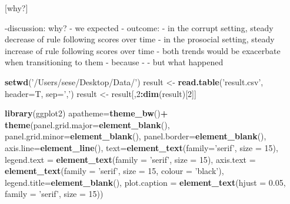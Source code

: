 \documentclass[man]{apa6}
\newenvironment{Shaded}{\begin{snugshade}}{\end{snugshade}}
\newcommand{\DataTypeTok}[1]{\textcolor[rgb]{0.13,0.29,0.53}{#1}}
\newcommand{\DecValTok}[1]{\textcolor[rgb]{0.00,0.00,0.81}{#1}}
\newcommand{\FloatTok}[1]{\textcolor[rgb]{0.00,0.00,0.81}{#1}}
\newcommand{\KeywordTok}[1]{\textcolor[rgb]{0.13,0.29,0.53}{\textbf{#1}}}
\newcommand{\NormalTok}[1]{#1}
\newcommand{\OperatorTok}[1]{\textcolor[rgb]{0.81,0.36,0.00}{\textbf{#1}}}
\newcommand{\StringTok}[1]{\textcolor[rgb]{0.31,0.60,0.02}{#1}}
\begin{document}
{[}why?{]}

-discussion: why? - we expected - outcome: - in the corrupt setting,
steady decrease of rule following scores over time - in the prosocial
setting, steady increase of rule following scores over time - both
trends would be exacerbate when transitioning to them - because - - but
what happened

\begin{Shaded}
\begin{Highlighting}[]
\KeywordTok{setwd}\NormalTok{(}\StringTok{'/Users/sese/Desktop/Data/'}\NormalTok{)}
\NormalTok{result <-}\StringTok{ }\KeywordTok{read.table}\NormalTok{(}\StringTok{'result.csv'}\NormalTok{, }\DataTypeTok{header=}\NormalTok{T, }\DataTypeTok{sep=}\StringTok{','}\NormalTok{)}
\NormalTok{result <-}\StringTok{ }\NormalTok{result[,}\DecValTok{2}\OperatorTok{:}\KeywordTok{dim}\NormalTok{(result)[}\DecValTok{2}\NormalTok{]]}


\KeywordTok{library}\NormalTok{(ggplot2)}
\NormalTok{apatheme=}\KeywordTok{theme_bw}\NormalTok{()}\OperatorTok{+}
\StringTok{  }\KeywordTok{theme}\NormalTok{(}\DataTypeTok{panel.grid.major=}\KeywordTok{element_blank}\NormalTok{(),}
        \DataTypeTok{panel.grid.minor=}\KeywordTok{element_blank}\NormalTok{(),}
        \DataTypeTok{panel.border=}\KeywordTok{element_blank}\NormalTok{(),}
        \DataTypeTok{axis.line=}\KeywordTok{element_line}\NormalTok{(),}
        \DataTypeTok{text=}\KeywordTok{element_text}\NormalTok{(}\DataTypeTok{family=}\StringTok{'serif'}\NormalTok{, }\DataTypeTok{size =} \DecValTok{15}\NormalTok{),}
        \DataTypeTok{legend.text =} \KeywordTok{element_text}\NormalTok{(}\DataTypeTok{family =} \StringTok{'serif'}\NormalTok{, }\DataTypeTok{size =} \DecValTok{15}\NormalTok{),}
        \DataTypeTok{axis.text =} \KeywordTok{element_text}\NormalTok{(}\DataTypeTok{family =} \StringTok{'serif'}\NormalTok{, }\DataTypeTok{size =} \DecValTok{15}\NormalTok{, }\DataTypeTok{colour =} \StringTok{'black'}\NormalTok{),}
        \DataTypeTok{legend.title=}\KeywordTok{element_blank}\NormalTok{(),}
        \DataTypeTok{plot.caption =} \KeywordTok{element_text}\NormalTok{(}\DataTypeTok{hjust =} \FloatTok{0.05}\NormalTok{, }\DataTypeTok{family =} \StringTok{'serif'}\NormalTok{, }\DataTypeTok{size =} \DecValTok{15}\NormalTok{)) }


\end{Highlighting}
\end{Shaded}
\end{document}
